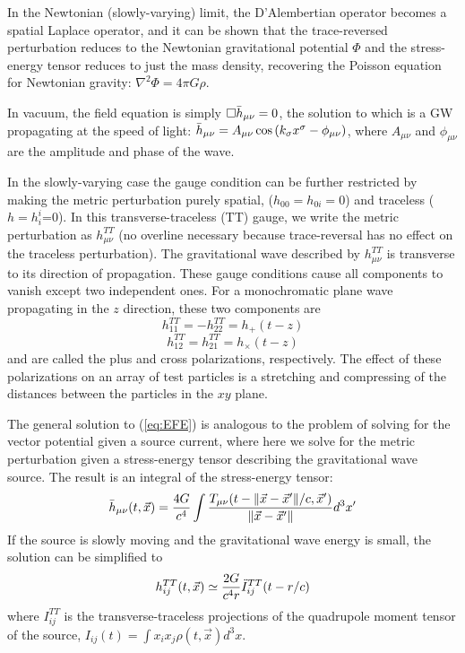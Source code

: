 In the Newtonian (slowly-varying) limit, the D'Alembertian operator becomes a spatial Laplace operator, and it can be shown that the trace-reversed perturbation reduces to the Newtonian gravitational potential $\Phi$ and the stress-energy tensor reduces to just the mass density, recovering the Poisson equation for Newtonian gravity: $\nabla^2\Phi = 4\pi G\rho$.

In vacuum, the field equation is simply $\Box\Bar{h}_{\mu\nu}=0$, the solution to which is a \ac{GW} propagating at the speed of light: $\Bar{h}_{\mu\nu} = A_{\mu\nu}\cos\left(k_\sigma x^\sigma - \phi_{\mu\nu}\right)$, where $A_{\mu\nu}$ and $\phi_{\mu\nu}$ are the amplitude and phase of the wave.

In the slowly-varying case the gauge condition can be further restricted by making the metric perturbation purely spatial, ($h_{00}=h_{0i}=0$) and traceless ($h=h_i^i$=0).
In this transverse-traceless (TT) gauge, we write the metric perturbation as $h_{\mu\nu}^{TT}$ (no overline necessary because trace-reversal has no effect on the traceless perturbation).
The gravitational wave described by $h_{\mu\nu}^{TT}$ is transverse to its direction of propagation.
These gauge conditions cause all components to vanish except two independent ones.
For a monochromatic plane wave propagating in the $z$ direction, these two components are
$$h_{11}^{TT} = -h_{22}^{TT} = h_+(t-z)$$
$$h_{12}^{TT} = h_{21}^{TT} = h_{\times}(t-z)$$
and are called the plus and cross polarizations, respectively.
The effect of these polarizations on an array of test particles is a stretching and compressing of the distances between the particles in the $xy$ plane.

The general solution to (\ref{eq:EFE}) is analogous to the problem of solving for the vector potential given a source current, where here we solve for the metric perturbation given a stress-energy tensor describing the gravitational wave source.
The result is an integral of the stress-energy tensor:
$$\Bar{h}_{\mu\nu}(t, \vec{x}) = \frac{4G}{c^4} \int\frac{T_{\mu\nu}(t - \norm{\vec{x} - \vec{x}'}/c, \vec{x}')}{\norm{\vec{x} - \vec{x}'}} d^3x'$$
If the source is slowly moving and the gravitational wave energy is small, the solution can be simplified to
\begin{equation}\label{eq:quadrupole}
	h_{ij}^{TT}(t, \vec{x}) \simeq \frac{2G}{c^4r} \Ddot{I}_{ij}^{TT}(t - r/c)
\end{equation}
where $I_{ij}^{TT}$ is the transverse-traceless projections of the quadrupole moment tensor of the source, $I_{ij}(t) = \int x_i x_j \rho(t, \vec{x}) d^3x$.

